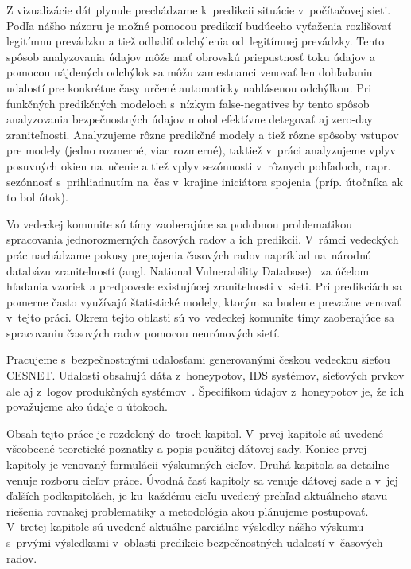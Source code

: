 \documentclass[thesismargins, thesislinespacing, openright, upjsfrontpage]{rnthesis}
\begin{document}
Z vizualizácie dát plynule prechádzame k~predikcii situácie v~počítačovej sieti. Podľa nášho názoru je možné pomocou predikcií budúceho vyťaženia rozlišovať legitímnu prevádzku a tiež odhaliť odchýlenia od~legitímnej prevádzky. Tento spôsob analyzovania údajov môže mať obrovskú priepustnosť toku údajov a pomocou nájdených odchýlok sa môžu zamestnanci venovať len dohľadaniu udalostí pre konkrétne časy určené automaticky nahlásenou odchýlkou. Pri funkčných predikčných modeloch s~nízkym false-negatives by tento spôsob analyzovania bezpečnostných údajov mohol efektívne detegovať aj zero-day zraniteľnosti. Analyzujeme rôzne predikčné modely a tiež rôzne spôsoby vstupov pre modely (jedno rozmerné, viac rozmerné), taktiež v~práci analyzujeme vplyv posuvných okien na~učenie a tiež vplyv sezónnosti v~rôznych pohľadoch, napr. sezónnosť s~prihliadnutím na~čas v~krajine iniciátora spojenia (príp. útočníka ak to bol útok).

Vo vedeckej komunite sú tímy zaoberajúce sa podobnou problematikou spracovania jednorozmerných časových radov a ich predikcii. V~rámci vedeckých prác nachádzame pokusy prepojenia časových radov napríklad na~národnú databázu zraniteľností (angl. National Vulnerability Database)~\cite{roumani2015time} za účelom hľadania vzoriek a predpovede existujúcej zraniteľnosti v~sieti. Pri predikciách sa pomerne často využívajú štatistické modely, ktorým sa budeme prevažne venovať v~tejto práci. Okrem tejto oblasti sú vo~vedeckej komunite tímy zaoberajúce sa spracovaniu časových radov pomocou neurónových sietí.

Pracujeme s~bezpečnostnými udalosťami generovanými českou vedeckou sieťou CESNET. Udalosti obsahujú dáta z~honeypotov, IDS systémov, sieťových prvkov ale aj z~logov produkčných systémov~\cite{kacha2015warden}. Špecifikom údajov z~honeypotov je, že ich považujeme ako údaje o útokoch.

Obsah tejto práce je rozdelený do~troch kapitol. V~prvej kapitole sú uvedené všeobecné teoretické poznatky a popis použitej dátovej sady. Koniec prvej kapitoly je venovaný formulácii výskumných cieľov. Druhá kapitola sa detailne venuje rozboru cieľov práce. Úvodná časť kapitoly sa venuje dátovej sade a v~jej ďalších podkapitolách, je ku~každému cieľu uvedený prehľad aktuálneho stavu riešenia rovnakej problematiky a metodológia akou plánujeme postupovať. V~tretej kapitole sú uvedené aktuálne parciálne výsledky nášho výskumu s~prvými výsledkami v~oblasti predikcie bezpečnostných udalostí v~časových radov.

 
\end{document}
